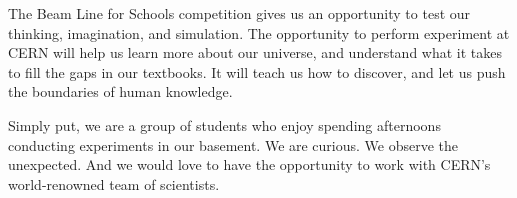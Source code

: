 \documentclass[12pt,letterpaper]{article}
\begin{document}
The Beam Line for Schools competition gives us an opportunity to test our thinking, imagination, and simulation. 
The opportunity to perform experiment at CERN will help us learn more about our universe, and understand what it takes to fill the gaps in our textbooks.
It will teach us how to discover, and let us push the boundaries of human knowledge.

Simply put, we are a group of students who enjoy spending afternoons conducting experiments in our basement. We are curious. We observe the unexpected.
And we would love to have the opportunity to work with CERN’s world-renowned team of scientists.
\end{document}
